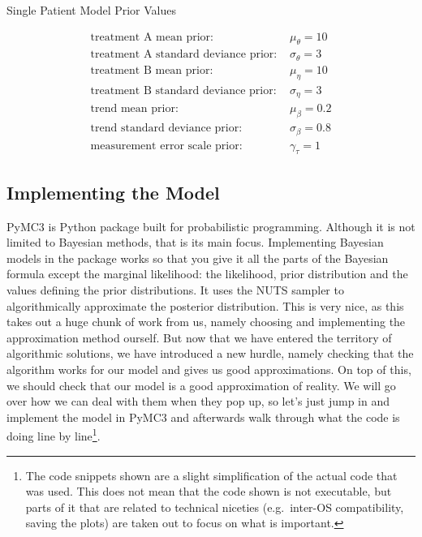 \documentclass[12pt,a4paper,leqno]{report}
\theoremstyle{plain}
\theoremstyle{definition}
\theoremstyle{remark}
\begin{document}
\begin{table}[H]
    \caption{Single Patient Model Prior Values}\label{singlelpatientmodelpriorvalues}
    \begin{align}\label{}
        \text{treatment A mean prior: } & \mu_{\theta} = 10 \nonumber \\
        \text{treatment A standard deviance prior: } & \sigma_{\theta} = 3 \nonumber \\
        \text{treatment B mean prior: } & \mu_{\eta} = 10 \nonumber \\
        \text{treatment B standard deviance prior: } & \sigma_{\eta} = 3 \nonumber \\
        \text{trend mean prior: } & \mu_{\beta} = 0.2 \nonumber \\
        \text{trend standard deviance prior: } & \sigma_{\beta} = 0.8 \nonumber \\
        \text{measurement error scale prior: } & \gamma_{\tau} = 1 \nonumber
    \end{align}
\end{table}

\subsection{Implementing the Model}

PyMC3 is Python package built for probabilistic programming. Although it is not
limited to Bayesian methods, that is its main focus. Implementing Bayesian models in
the package works so that you give it all the parts of the Bayesian formula except the
marginal likelihood: the likelihood, prior
distribution and the values defining the prior distributions. It uses the NUTS
sampler\cite{nuts} to algorithmically approximate the posterior distribution. This is
very nice, as this takes out a huge chunk of work from us, namely choosing and
implementing the approximation method
ourself. But now that we have entered the territory of algorithmic solutions, we have
introduced a new hurdle, namely checking that the algorithm works for our
model and gives us good approximations. On top of this, we should check that our model is a good
approximation of reality. We will go over how  we can deal with them when they pop up, so let's just jump in and
implement the model in PyMC3 and afterwards walk through what the code is
doing line by line\footnote{The code snippets shown are a
slight simplification of the actual code that was used. This does not mean
that the code shown is not executable, but parts of it that are related to technical niceties
(e.g.\ inter-OS compatibility, saving the plots) are taken out to focus on what is
important.}.
\end{document}
